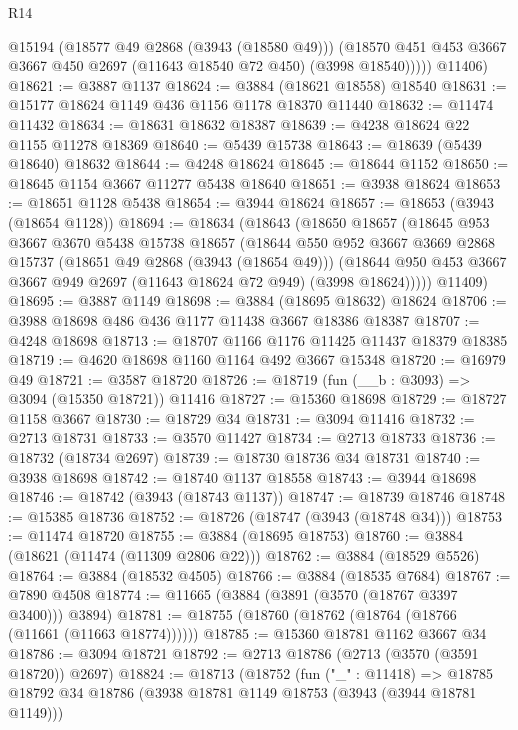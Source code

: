 \begin{lexlean}{R14}
\begin{coremodule}
            @15194
            (@18577 @49 @2868 (@3943 (@18580 @49)))
            (@18570 @451 @453 @3667 @3667 @450 @2697 (@11643 @18540 @72 @450) (@3998 @18540)))))
      @11406)
@18621 := @3887 @1137
@18624 := @3884 (@18621 @18558) @18540
@18631 := @15177 @18624 @1149 @436 @1156 @1178 @18370 @11440
@18632 := @11474 @11432
@18634 := @18631 @18632 @18387
@18639 := @4238 @18624 @22 @1155 @11278 @18369
@18640 := @5439 @15738
@18643 := @18639 (@5439 @18640) @18632
@18644 := @4248 @18624
@18645 := @18644 @1152
@18650 := @18645 @1154 @3667 @11277 @5438 @18640
@18651 := @3938 @18624
@18653 := @18651 @1128 @5438
@18654 := @3944 @18624
@18657 := @18653 (@3943 (@18654 @1128))
@18694 := @18634
    (@18643
      (@18650
        @18657
        (@18645
          @953
          @3667
          @3670
          @5438
          @15738
          @18657
          (@18644
            @550
            @952
            @3667
            @3669
            @2868
            @15737
            (@18651 @49 @2868 (@3943 (@18654 @49)))
            (@18644 @950 @453 @3667 @3667 @949 @2697 (@11643 @18624 @72 @949) (@3998 @18624)))))
      @11409)
@18695 := @3887 @1149
@18698 := @3884 (@18695 @18632) @18624
@18706 := @3988 @18698 @486 @436 @1177 @11438 @3667 @18386 @18387
@18707 := @4248 @18698
@18713 := @18707 @1166 @1176 @11425 @11437 @18379 @18385
@18719 := @4620 @18698 @1160 @1164 @492 @3667 @15348
@18720 := @16979 @49
@18721 := @3587 @18720
@18726 := @18719 (fun (__b : @3093) => @3094 (@15350 @18721)) @11416
@18727 := @15360 @18698
@18729 := @18727 @1158 @3667
@18730 := @18729 @34
@18731 := @3094 @11416
@18732 := @2713 @18731
@18733 := @3570 @11427
@18734 := @2713 @18733
@18736 := @18732 (@18734 @2697)
@18739 := @18730 @18736 @34 @18731
@18740 := @3938 @18698
@18742 := @18740 @1137 @18558
@18743 := @3944 @18698
@18746 := @18742 (@3943 (@18743 @1137))
@18747 := @18739 @18746
@18748 := @15385 @18736
@18752 := @18726 (@18747 (@3943 (@18748 @34)))
@18753 := @11474 @18720
@18755 := @3884 (@18695 @18753)
@18760 := @3884 (@18621 (@11474 (@11309 @2806 @22)))
@18762 := @3884 (@18529 @5526)
@18764 := @3884 (@18532 @4505)
@18766 := @3884 (@18535 @7684)
@18767 := @7890 @4508
@18774 := @11665 (@3884 (@3891 (@3570 (@18767 @3397 @3400))) @3894)
@18781 := @18755 (@18760 (@18762 (@18764 (@18766 (@11661 (@11663 @18774))))))
@18785 := @15360 @18781 @1162 @3667 @34
@18786 := @3094 @18721
@18792 := @2713 @18786 (@2713 (@3570 (@3591 @18720)) @2697)
@18824 := @18713
    (@18752
      (fun ("_" : @11418) =>
      @18785
        @18792
        @34
        @18786
        (@3938 @18781 @1149 @18753 (@3943 (@3944 @18781 @1149)))

\end{coremodule}
\end{lexlean}
